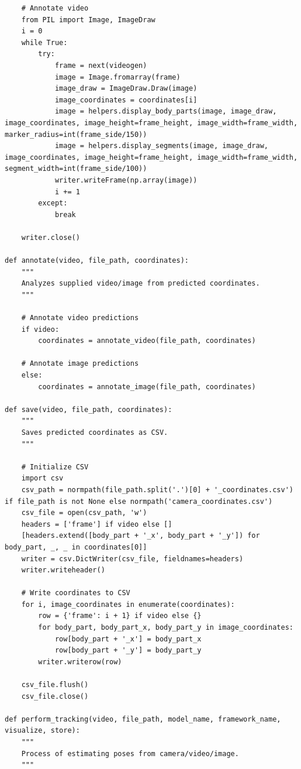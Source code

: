 \documentclass{fisatprojectfinal}
\begin{document}
\begin{appendices}
\begin{lstlisting}
    # Annotate video
    from PIL import Image, ImageDraw
    i = 0
    while True:
        try:
            frame = next(videogen)
            image = Image.fromarray(frame) 
            image_draw = ImageDraw.Draw(image)
            image_coordinates = coordinates[i]
            image = helpers.display_body_parts(image, image_draw, image_coordinates, image_height=frame_height, image_width=frame_width, marker_radius=int(frame_side/150))
            image = helpers.display_segments(image, image_draw, image_coordinates, image_height=frame_height, image_width=frame_width, segment_width=int(frame_side/100))
            writer.writeFrame(np.array(image))
            i += 1
        except:
            break
                
    writer.close()

def annotate(video, file_path, coordinates):
    """
    Analyzes supplied video/image from predicted coordinates.
    """
    
    # Annotate video predictions
    if video:
        coordinates = annotate_video(file_path, coordinates)
    
    # Annotate image predictions
    else:
        coordinates = annotate_image(file_path, coordinates)
    
def save(video, file_path, coordinates):
    """
    Saves predicted coordinates as CSV.
    """
        
    # Initialize CSV
    import csv
    csv_path = normpath(file_path.split('.')[0] + '_coordinates.csv') if file_path is not None else normpath('camera_coordinates.csv')
    csv_file = open(csv_path, 'w')
    headers = ['frame'] if video else []
    [headers.extend([body_part + '_x', body_part + '_y']) for body_part, _, _ in coordinates[0]]
    writer = csv.DictWriter(csv_file, fieldnames=headers)
    writer.writeheader()  

    # Write coordinates to CSV
    for i, image_coordinates in enumerate(coordinates):
        row = {'frame': i + 1} if video else {}
        for body_part, body_part_x, body_part_y in image_coordinates:
            row[body_part + '_x'] = body_part_x
            row[body_part + '_y'] = body_part_y
        writer.writerow(row)
            
    csv_file.flush()
    csv_file.close()
    
def perform_tracking(video, file_path, model_name, framework_name, visualize, store):
    """
    Process of estimating poses from camera/video/image.
    """
    

\end{lstlisting}
\end{appendices}
\end{document}
